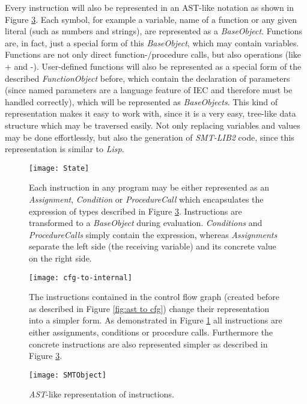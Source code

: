 Every instruction will also be represented in an AST-like notation as shown in Figure \ref{fig:smtobject}. Each symbol, for example a variable, name of a function or any given literal (such as numbers and strings), are represented as a \emph{BaseObject}. Functions are, in fact, just a special form of this \emph{BaseObject}, which may contain variables. Functions are not only direct function-/procedure calls, but also operations (like + and -). User-defined functions will also be represented as a special form of the described \emph{FunctionObject} before, which contain the declaration of parameters (since named parameters are a language feature of IEC and therefore must be handled correctly), which will be represented as \emph{BaseObjects}. 
This kind of representation makes it easy to work with, since it is a very easy, tree-like data structure which may be traversed easily. Not only replacing variables and values may be done effortlessly, but also the generation of \emph{SMT-LIB2} code, since this representation is similar to \emph{Lisp}.
\begin{figure}[h!]
	\centering
	\texttt{[image: State]}
	\caption{Each instruction in any program may be either represented as an \emph{Assignment}, \emph{Condition} or \emph{ProcedureCall} which encapsulates the expression of types described in Figure \ref{fig:smtobject}. Instructions are transformed to a \emph{BaseObject} during evaluation. \emph{Conditions} and \emph{ProcedureCalls} simply contain the expression, whereas \emph{Assignments} separate the left side (the receiving variable) and its concrete value on the right side.}
	\label{fig:state}
\end{figure}
\begin{figure}[hbt!]
	\centering
	\texttt{[image: cfg-to-internal]}
	\caption{The instructions contained in the control flow graph (created before as described in Figure \ref{fig:ast to cfg}) change their representation into a simpler form. As demonstrated in Figure \ref{fig:state} all instructions are either assignments, conditions or procedure calls. Furthermore the concrete instructions are also represented simpler as described in Figure \ref{fig:smtobject}. }
	\label{fig:cfg to internal}
\end{figure}

\begin{figure}[h!]
	\centering
	\texttt{[image: SMTObject]}
	\caption{\emph{AST}-like representation of instructions. }
	\label{fig:smtobject}
\end{figure}
\clearpage
\pagebreak
